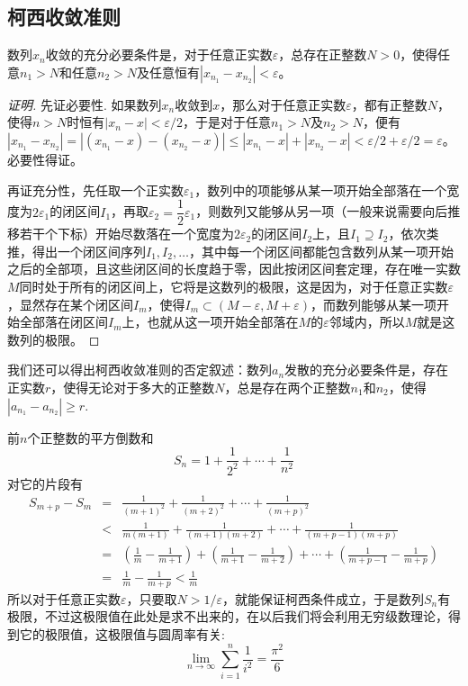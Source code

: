 \subsection{柯西收敛准则}
\label{sec:cauchy-convergence-rule}

\begin{theorem}[柯西收敛准则]
  数列$x_n$收敛的充分必要条件是，对于任意正实数$\varepsilon$，总存在正整数$N>0$，使得任意$n_1>N$和任意$n_2>N$及任意恒有$|x_{n_1}-x_{n_2}| < \varepsilon$。
\end{theorem}

\begin{proof}[证明]
  先证必要性. 如果数列$x_n$收敛到$x$，那么对于任意正实数$\varepsilon$，都有正整数$N$，使得$n>N$时恒有$|x_n-x|<\varepsilon / 2$，于是对于任意$n_1>N$及$n_2>N$，便有$|x_{n_1}-x_{n_2}|=|(x_{n_1}-x)- (x_{n_2}-x)|\leqslant |x_{n_1}-x|+|x_{n_2}-x|<\varepsilon / 2+\varepsilon / 2 = \varepsilon$。必要性得证。

  再证充分性，先任取一个正实数$\varepsilon_1$，数列中的项能够从某一项开始全部落在一个宽度为$2\varepsilon_1$的闭区间$I_1$，再取$\varepsilon_2 = \dfrac{1}{2}\varepsilon_1$，则数列又能够从另一项（一般来说需要向后推移若干个下标）开始尽数落在一个宽度为$2\varepsilon_2$的闭区间$I_2$上，且$I_1 \supseteq I_2$，依次类推，得出一个闭区间序列$I_1,I_2,\ldots$，其中每一个闭区间都能包含数列从某一项开始之后的全部项，且这些闭区间的长度趋于零，因此按闭区间套定理，存在唯一实数$M$同时处于所有的闭区间上，它将是这数列的极限，这是因为，对于任意正实数$\varepsilon$，显然存在某个闭区间$I_m$，使得$I_m \subset (M-\varepsilon,M+\varepsilon)$，而数列能够从某一项开始全部落在闭区间$I_m$上，也就从这一项开始全部落在$M$的$\varepsilon$邻域内，所以$M$就是这数列的极限。
\end{proof}

我们还可以得出柯西收敛准则的否定叙述：数列$a_n$发散的充分必要条件是，存在正实数$r$，使得无论对于多大的正整数$N$，总是存在两个正整数$n_1$和$n_2$，使得$|a_{n_1}-a_{n_2}| \geqslant r$.

\begin{example}
  前$n$个正整数的平方倒数和
  \[ S_n = 1 + \frac{1}{2^2} + \cdots + \frac{1}{n^2} \]
  对它的片段有
  \begin{eqnarray*}
    S_{m+p}-S_m  & = & \frac{1}{(m+1)^2} + \frac{1}{(m+2)^2} + \cdots + \frac{1}{(m+p)^2} \\
                 & < & \frac{1}{m(m+1)} + \frac{1}{(m+1)(m+2)} + \cdots + \frac{1}{(m+p-1)(m+p)} \\
                 & = & \left( \frac{1}{m} - \frac{1}{m+1} \right) + \left( \frac{1}{m+1} - \frac{1}{m+2} \right) + \cdots + \left( \frac{1}{m+p-1} - \frac{1}{m+p} \right) \\
    & = & \frac{1}{m} - \frac{1}{m+p} < \frac{1}{m}
  \end{eqnarray*}
  所以对于任意正实数$\varepsilon$，只要取$N>1/\varepsilon$，就能保证柯西条件成立，于是数列$S_n$有极限，不过这极限值在此处是求不出来的，在以后我们将会利用无穷级数理论，得到它的极限值，这极限值与圆周率有关:
  \[ \lim_{n \to \infty} \sum_{i=1}^n \frac{1}{i^2} = \frac{\pi^2}{6} \]
\end{example}

